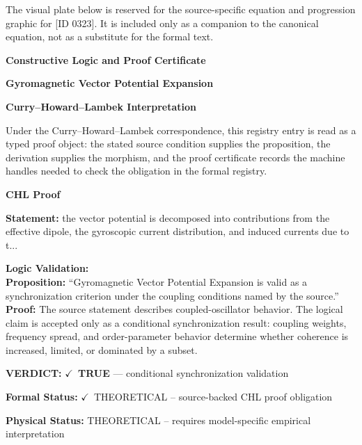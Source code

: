 \begingroup\footnotesize\sloppy
The visual plate below is reserved for the source-specific equation and progression graphic for [ID 0323]. It is included only as a companion to the canonical equation, not as a substitute for the formal text.
\par\endgroup
\ifTZPDarkEdition
{}
\fi

\clearpage
\begingroup\tzpsupportsetup
\noindent\textbf{\fontsize{10.8pt}{12.8pt}\selectfont [ID 0323] Constructive Logic and Proof Certificate}\par
\noindent\textbf{\fontsize{10pt}{12pt}\selectfont Gyromagnetic Vector Potential Expansion}\par
\vspace{0.45em}
\begingroup
\footnotesize
\setlength{\parskip}{0.22em}
\setlength{\parindent}{0pt}
\noindent\textbf{Curry--Howard--Lambek Interpretation}\par
Under the Curry--Howard--Lambek correspondence, this registry entry is read as a typed proof
object: the stated source condition supplies the proposition, the derivation supplies the
morphism, and the proof certificate records the machine handles needed to check the obligation
in the formal registry.

\vspace{0.45em}
\noindent\textbf{CHL Proof}\par
\textbf{Statement:} the vector potential is decomposed into contributions from the effective dipole, the
gyroscopic current distribution, and induced currents due to t...

\textbf{Logic Validation:}\\
\textbf{Proposition:} ``Gyromagnetic Vector Potential Expansion is valid as a synchronization criterion under
the coupling conditions named by the source.''\\
\textbf{Proof:} The source statement describes coupled-oscillator behavior. The logical claim is
accepted only as a conditional synchronization result: coupling weights, frequency
spread, and order-parameter behavior determine whether coherence is increased, limited,
or dominated by a subset.

\textbf{VERDICT:} \ensuremath{\checkmark}\ \textbf{TRUE} --- conditional synchronization validation

\textbf{Formal Status:} \ensuremath{\checkmark}\ THEORETICAL -- source-backed CHL proof obligation

\textbf{Physical Status:} THEORETICAL -- requires model-specific empirical interpretation
\par\vspace{0.45em}
\par
\ifTZPDarkEdition
{}
\fi
\endgroup
\endgroup
